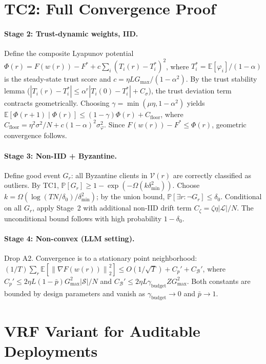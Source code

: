 \documentclass{article}
\newcommand{\E}{\mathbb{E}}
\renewcommand{\Pr}{\mathbb{P}}
\newcommand{\norm}[1]{\left\lVert #1 \right\rVert}
\newcommand{\calB}{\mathcal{B}}      %
\newcommand{\calV}{\mathcal{V}}      %
\newcommand{\calS}{\mathcal{S}}      %
\newcommand{\calL}{\mathcal{L}}      %
\begin{document}
\section{TC2: Full Convergence Proof}
\label{app:convergence}

\paragraph{Stage 2: Trust-dynamic weights, IID.}
Define the composite Lyapunov potential
$\Phi(r) = F(w(r)) - F^* + c \sum_i (T_i(r) - T_i^*)^2$,
where $T_i^* = \E[\varphi_i]/(1-\alpha)$ is the steady-state trust score and
$c = \eta L G_{\max} / (1-\alpha^2)$.
By the trust stability lemma ($|T_i(r) - T_i^*| \leq \alpha^r|T_i(0) - T_i^*| + C_{\sigma}$),
the trust deviation term contracts geometrically.
Choosing $\gamma = \min(\mu\eta, 1-\alpha^2)$ yields
$\E[\Phi(r+1) \mid \Phi(r)] \leq (1-\gamma)\Phi(r) + C_{\mathrm{floor}}$,
where $C_{\mathrm{floor}} = \eta^2\sigma^2/N + c(1-\alpha)^2\sigma_\varphi^2$.
Since $F(w(r)) - F^* \leq \Phi(r)$, geometric convergence follows.

\paragraph{Stage 3: Non-IID + Byzantine.}
Define good event $G_r$: all Byzantine clients in $\calV(r)$ are correctly
classified as outliers.
By TC1, $\Pr[G_r] \geq 1 - \exp(-\Omega(k\delta_{\min}^2))$.
Choose $k = \Omega(\log(TN/\delta_0)/\delta_{\min}^2)$; by the union bound,
$\Pr[\exists r: \neg G_r] \leq \delta_0$.
Conditional on all $G_r$, apply Stage~2 with additional non-IID drift term
$C_{\zeta} = \zeta\eta|\calL|/N$.
The unconditional bound follows with high probability $1-\delta_0$.

\paragraph{Stage 4: Non-convex (LLM setting).}
Drop A2. Convergence is to a stationary point neighborhood:
$(1/T)\sum_r \E[\norm{\nabla F(w(r))}_2^2]
\leq O(1/\sqrt{T}) + C_p' + C_{\calB}'$,
where $C_p' \leq 2\eta L (1-\bar{p})G_{\max}^2|\calS|/N$ and
$C_{\calB}' \leq 2\eta L \gamma_{\mathrm{budget}} Z G_{\max}^2$.
Both constants are bounded by design parameters and vanish as
$\gamma_{\mathrm{budget}} \to 0$ and $\bar{p} \to 1$.

\section{VRF Variant for Auditable Deployments}
\label{app:vrf}
\end{document}
